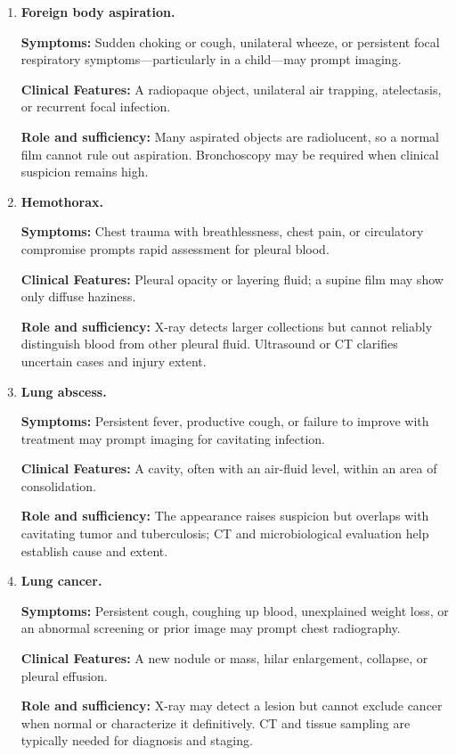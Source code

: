 \begin{enumerate}[leftmargin=*,itemsep=0.45em,topsep=0.4em]
\item \textbf{Foreign body aspiration.}\par\noindent\textbf{Symptoms:} Sudden choking or cough, unilateral wheeze, or persistent focal respiratory symptoms—particularly in a child—may prompt imaging.\par\noindent\textbf{Clinical Features:} A radiopaque object, unilateral air trapping, atelectasis, or recurrent focal infection.\par\noindent\textbf{Role and sufficiency:} Many aspirated objects are radiolucent, so a normal film cannot rule out aspiration. Bronchoscopy may be required when clinical suspicion remains high.
\item \textbf{Hemothorax.}\par\noindent\textbf{Symptoms:} Chest trauma with breathlessness, chest pain, or circulatory compromise prompts rapid assessment for pleural blood.\par\noindent\textbf{Clinical Features:} Pleural opacity or layering fluid; a supine film may show only diffuse haziness.\par\noindent\textbf{Role and sufficiency:} X-ray detects larger collections but cannot reliably distinguish blood from other pleural fluid. Ultrasound or CT clarifies uncertain cases and injury extent.
\item \textbf{Lung abscess.}\par\noindent\textbf{Symptoms:} Persistent fever, productive cough, or failure to improve with treatment may prompt imaging for cavitating infection.\par\noindent\textbf{Clinical Features:} A cavity, often with an air-fluid level, within an area of consolidation.\par\noindent\textbf{Role and sufficiency:} The appearance raises suspicion but overlaps with cavitating tumor and tuberculosis; CT and microbiological evaluation help establish cause and extent.
\item \textbf{Lung cancer.}\par\noindent\textbf{Symptoms:} Persistent cough, coughing up blood, unexplained weight loss, or an abnormal screening or prior image may prompt chest radiography.\par\noindent\textbf{Clinical Features:} A new nodule or mass, hilar enlargement, collapse, or pleural effusion.\par\noindent\textbf{Role and sufficiency:} X-ray may detect a lesion but cannot exclude cancer when normal or characterize it definitively. CT and tissue sampling are typically needed for diagnosis and staging.

\end{enumerate}
